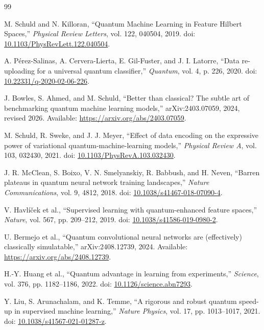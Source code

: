 \begin{thebibliography}{99}
\raggedright
\small\sloppy
{}
M. Schuld and N. Killoran, ``Quantum Machine Learning in Feature Hilbert Spaces,'' \emph{Physical Review Letters}, vol. 122, 040504, 2019. doi: \href{https://doi.org/10.1103/PhysRevLett.122.040504}{10.1103/PhysRevLett.122.040504}.

A. P\'erez-Salinas, A. Cervera-Lierta, E. Gil-Fuster, and J. I. Latorre, ``Data re-uploading for a universal quantum classifier,'' \emph{Quantum}, vol. 4, p. 226, 2020. doi: \href{https://doi.org/10.22331/q-2020-02-06-226}{10.22331/q-2020-02-06-226}.

J. Bowles, S. Ahmed, and M. Schuld, ``Better than classical? The subtle art of benchmarking quantum machine learning models,'' arXiv:2403.07059, 2024, revised 2026. Available: \url{https://arxiv.org/abs/2403.07059}.

M. Schuld, R. Sweke, and J. J. Meyer, ``Effect of data encoding on the expressive power of variational quantum-machine-learning models,'' \emph{Physical Review A}, vol. 103, 032430, 2021. doi: \href{https://doi.org/10.1103/PhysRevA.103.032430}{10.1103/PhysRevA.103.032430}.

J. R. McClean, S. Boixo, V. N. Smelyanskiy, R. Babbush, and H. Neven, ``Barren plateaus in quantum neural network training landscapes,'' \emph{Nature Communications}, vol. 9, 4812, 2018. doi: \href{https://doi.org/10.1038/s41467-018-07090-4}{10.1038/s41467-018-07090-4}.

V. Havl\'i\v{c}ek et al., ``Supervised learning with quantum-enhanced feature spaces,'' \emph{Nature}, vol. 567, pp. 209--212, 2019. doi: \href{https://doi.org/10.1038/s41586-019-0980-2}{10.1038/s41586-019-0980-2}.

U. Bermejo et al., ``Quantum convolutional neural networks are (effectively) classically simulatable,'' arXiv:2408.12739, 2024. Available: \url{https://arxiv.org/abs/2408.12739}.

H.-Y. Huang et al., ``Quantum advantage in learning from experiments,'' \emph{Science}, vol. 376, pp. 1182--1186, 2022. doi: \href{https://doi.org/10.1126/science.abn7293}{10.1126/science.abn7293}.

Y. Liu, S. Arunachalam, and K. Temme, ``A rigorous and robust quantum speed-up in supervised machine learning,'' \emph{Nature Physics}, vol. 17, pp. 1013--1017, 2021. doi: \href{https://doi.org/10.1038/s41567-021-01287-z}{10.1038/s41567-021-01287-z}.


\end{thebibliography}
